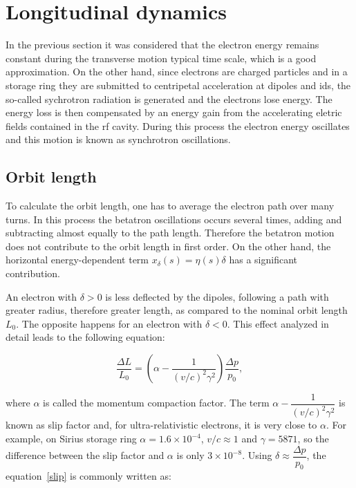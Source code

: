 \section{Longitudinal dynamics}\label{longitudinal}

In the previous section it was considered that the electron energy remains constant during the transverse motion typical time scale, which is a good approximation. On the other hand, since electrons are charged particles and in a storage ring they are submitted to centripetal acceleration at dipoles and \gls{id}s, the so-called sychrotron radiation is generated and the electrons lose energy. The energy loss is then compensated by an energy gain from the accelerating eletric fields contained in the \gls{rf} cavity. During this process the electron energy oscillates and this motion is known as synchrotron oscillations.

\subsection{Orbit length}

To calculate the orbit length, one has to average the electron path over many turns. In this process the betatron oscillations occurs several times, adding and subtracting almost equally to the path length. Therefore the betatron motion does not contribute to the orbit length in first order. On the other hand, the horizontal energy-dependent term $x_{\delta}(s) = \eta(s) \delta$ has a significant contribution. 

An electron with $\delta > 0$ is less deflected by the dipoles, following a path with greater radius, therefore greater length, as compared to the nominal orbit length $L_0$. The opposite happens for an electron with $\delta < 0$. This effect analyzed in detail leads to the following equation:

\begin{equation}
    \frac{\Delta L}{L_0} = \left(\alpha - \dfrac{1}{(v/c)^2\gamma^2}\right) \dfrac{\Delta p}{p_0},
    \label{slip}
\end{equation}

where $\alpha$ is called the momentum compaction factor. The term $\alpha - \dfrac{1}{(v/c)^2\gamma^2}$ is known as slip factor and, for ultra-relativistic electrons, it is very close to $\alpha$. For example, on Sirius storage ring $\alpha = 1.6 \times 10^{-4}$, $v/c \approx 1$ and $\gamma = 5871$, so the difference between the slip factor and $\alpha$ is only $3 \times 10^{-8}$. Using $\delta \approx \dfrac{\Delta p}{p_0}$, the equation~\eqref{slip} is commonly written as:


